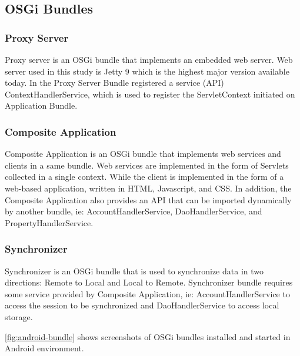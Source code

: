 \documentclass[conference]{IEEEtran}
\begin{document}
\subsection{OSGi Bundles}

\subsubsection{Proxy Server}
Proxy server is an OSGi bundle that implements an embedded web server. Web server used in this study is Jetty 9 which is the highest major version available today. In the Proxy Server Bundle registered a service (API) ContextHandlerService, which is used to register the ServletContext initiated on Application Bundle.

\subsubsection{Composite Application}
Composite Application is an OSGi bundle that implements web services and clients in a same bundle. Web services are implemented in the form of Servlets collected in a single context. While the client is implemented in the form of a web-based application, written in HTML, Javascript, and CSS. In addition, the Composite Application also provides an API that can be imported dynamically by another bundle, ie: AccountHandlerService, DaoHandlerService, and PropertyHandlerService.

\subsubsection{Synchronizer}
Synchronizer is an OSGi bundle that is used to synchronize data in two directions: Remote to Local and Local to Remote. Synchronizer bundle requires some service provided by Composite Application, ie: AccountHandlerService to access the session to be synchronized and DaoHandlerService to access local storage.

\figurename{\ref{fig:android-bundle}} shows screenshots of OSGi bundles installed and started in Android environment.
\end{document}
